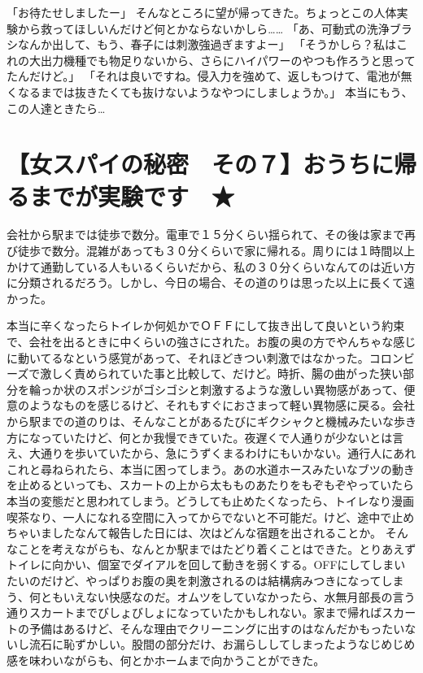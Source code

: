 「お待たせしましたー」
そんなところに望が帰ってきた。ちょっとこの人体実験から救ってほしいんだけど何とかならないかしら……
「あ、可動式の洗浄ブラシなんか出して、もう、春子には刺激強過ぎますよー」
「そうかしら？私はこれの大出力機種でも物足りないから、さらにハイパワーのやつも作ろうと思ってたんだけど。」
「それは良いですね。侵入力を強めて、返しもつけて、電池が無くなるまでは抜きたくても抜けないようなやつにしましょうか。」
本当にもう、この人達ときたら…


\section{【女スパイの秘密　その７】おうちに帰るまでが実験です　★}

会社から駅までは徒歩で数分。電車で１５分くらい揺られて、その後は家まで再び徒歩で数分。混雑があっても３０分くらいで家に帰れる。周りには１時間以上かけて通勤している人もいるくらいだから、私の３０分くらいなんてのは近い方に分類されるだろう。しかし、今日の場合、その道のりは思った以上に長くて遠かった。

本当に辛くなったらトイレか何処かでＯＦＦにして抜き出して良いという約束で、会社を出るときに中くらいの強さにされた。お腹の奥の方でやんちゃな感じに動いてるなという感覚があって、それほどきつい刺激ではなかった。コロンビーズで激しく責められていた事と比較して、だけど。時折、腸の曲がった狭い部分を輪っか状のスポンジがゴシゴシと刺激するような激しい異物感があって、便意のようなものを感じるけど、それもすぐにおさまって軽い異物感に戻る。会社から駅までの道のりは、そんなことがあるたびにギクシャクと機械みたいな歩き方になっていたけど、何とか我慢できていた。夜遅くで人通りが少ないとは言え、大通りを歩いていたから、急にうずくまるわけにもいかない。通行人にあれこれと尋ねられたら、本当に困ってしまう。あの水道ホースみたいなブツの動きを止めるといっても、スカートの上から太もものあたりをもぞもぞやっていたら本当の変態だと思われてしまう。どうしても止めたくなったら、トイレなり漫画喫茶なり、一人になれる空間に入ってからでないと不可能だ。けど、途中で止めちゃいましたなんて報告した日には、次はどんな宿題を出されることか。
そんなことを考えながらも、なんとか駅まではたどり着くことはできた。とりあえずトイレに向かい、個室でダイアルを回して動きを弱くする。OFFにしてしまいたいのだけど、やっぱりお腹の奥を刺激されるのは結構病みつきになってしまう、何ともいえない快感なのだ。オムツをしていなかったら、水無月部長の言う通りスカートまでびしょびしょになっていたかもしれない。家まで帰ればスカートの予備はあるけど、そんな理由でクリーニングに出すのはなんだかもったいないし流石に恥ずかしい。股間の部分だけ、お漏らししてしまったようなじめじめ感を味わいながらも、何とかホームまで向かうことができた。

